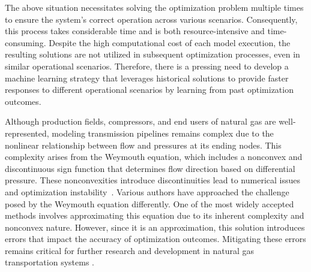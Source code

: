 The above situation necessitates solving the optimization problem multiple times to ensure the system's correct operation across various scenarios. Consequently, this process takes considerable time and is both resource-intensive and time-consuming. Despite the high computational cost of each model execution, the resulting solutions are not utilized in subsequent optimization processes, even in similar operational scenarios. Therefore, there is a pressing need to develop a machine learning strategy that leverages historical solutions to provide faster responses to different operational scenarios by learning from past optimization outcomes.

Although production fields, compressors, and end users of natural gas are well-represented, modeling transmission pipelines remains complex due to the nonlinear relationship between flow and pressures at its ending nodes. This complexity arises from the Weymouth equation, which includes a nonconvex and discontinuous sign function that determines flow direction based on differential pressure. These nonconvexities introduce discontinuities lead to numerical issues and optimization instability~\cite{YANG2020106023, JIANG2021106460}. Various authors have approached the challenge posed by the Weymouth equation differently. One of the most widely accepted methods involves approximating this equation due to its inherent complexity and nonconvex nature. However, since it is an approximation, this solution introduces errors that impact the accuracy of optimization outcomes. Mitigating these errors remains critical for further research and development in natural gas transportation systems \cite{review}.









